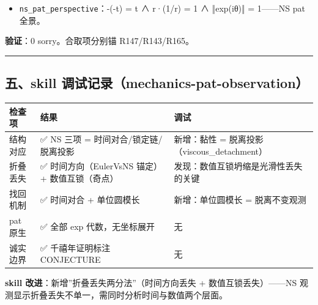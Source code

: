 \documentclass[
]{article}
\newcounter{none} %
\providecommand{\tightlist}{%
  \setlength{\itemsep}{0pt}\setlength{\parskip}{0pt}}
\begin{document}
\begin{itemize}
\tightlist
\item
  \texttt{ns\_pat\_perspective}：-(-t) = t ∧ r·(1/r) = 1 ∧ ‖exp(iθ)‖ =
  1------NS pat 全景。
\end{itemize}

\textbf{验证}：0 sorry。合取项分别锚 R147/R143/R165。

\begin{center}\rule{0.5\linewidth}{0.5pt}\end{center}

\subsection{五、skill
调试记录（mechanics-pat-observation）}\label{ux4e94skill-ux8c03ux8bd5ux8bb0ux5f55mechanics-pat-observation}

{\def\LTcaptype{none} %
\begin{longtable}[]{@{}
  >{\raggedright\arraybackslash}p{}
  >{\raggedright\arraybackslash}p{}
  >{\raggedright\arraybackslash}p{}@{}}
\toprule\noalign{}
\begin{minipage}[b]{\linewidth}\raggedright
检查项
\end{minipage} & \begin{minipage}[b]{\linewidth}\raggedright
结果
\end{minipage} & \begin{minipage}[b]{\linewidth}\raggedright
调试
\end{minipage} \\
\midrule\noalign{}
\endhead
\bottomrule\noalign{}
\endlastfoot
结构对应 & ✅ NS 三项 = 时间对合/锁定链/脱离投影 & 新增：黏性 =
脱离投影（viscous\_detachment） \\
折叠丢失 & ✅ 时间方向（EulerVsNS 锚定）+ 数值互锁（奇点） &
发现：数值互锁坍缩是光滑性丢失的关键 \\
找回机制 & ✅ 时间对合 + 单位圆模长 & 新增：单位圆模长 = 脱离不变观测 \\
pat 原生 & ✅ 全部 exp 代数，无坐标展开 & 无 \\
诚实边界 & ✅ 千禧年证明标注 CONJECTURE & 无 \\
\end{longtable}
}

\textbf{skill 改进}：新增''折叠丢失两分法''（时间方向丢失 +
数值互锁丢失）------NS
观测显示折叠丢失不单一，需同时分析时间与数值两个层面。
\end{document}

